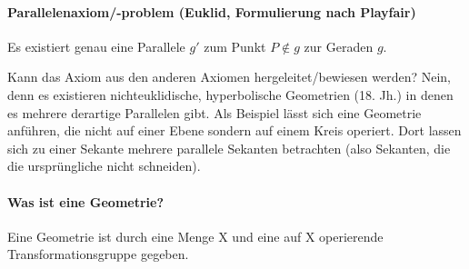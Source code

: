 \documentclass[12pt,a4paper,parskip=half-,DIV=15]{scrreprt}
\begin{document}
\paragraph{Parallelenaxiom/-problem (Euklid, Formulierung nach Playfair)} Es existiert genau eine Parallele $ g' $ zum Punkt $ P \notin g $ zur Geraden $ g $.

Kann das Axiom aus den anderen Axiomen hergeleitet/bewiesen werden? Nein, denn es existieren nichteuklidische, hyperbolische Geometrien (18. Jh.) in denen es mehrere derartige Parallelen gibt. Als Beispiel lässt sich eine Geometrie anführen, die nicht auf einer Ebene sondern auf einem Kreis operiert. Dort lassen sich zu einer Sekante mehrere parallele Sekanten betrachten (also Sekanten, die die ursprüngliche nicht schneiden).

\begin{figure}[H]
\begin{minipage}{.45\textwidth}
\end{minipage}
\begin{minipage}{.45\textwidth}
\end{minipage}
\end{figure}

\paragraph{Was ist eine Geometrie?} Eine Geometrie ist durch eine Menge X und eine auf X operierende Transformationsgruppe gegeben.
\end{document}
